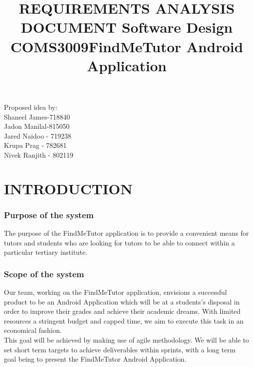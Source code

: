 \documentclass[12pt]{article}
\begin{document}
\title{\textbf{REQUIREMENTS ANALYSIS DOCUMENT }}
\maketitle

\begin{center}
\title{\textbf{Software Design COMS3009}}
\maketitle 
\end{center}
\begin{center}
\title{\textbf{FindMeTutor Android Application}}
\maketitle 
\end{center}

\begin{center}
Proposed idea by:\\
Shaneel James-718840
\\Jadon Manilal-815050
\\Jared Naidoo - 719238
\\Krupa Prag - 782681
\\Nivek Ranjith - 802119
\end{center}

\newpage

\tableofcontents
\newpage
\section{INTRODUCTION}
\subsubsection{Purpose of the system}
\begin{flushleft}
The purpose of the FindMeTutor application is to provide a convenient means for tutors and students who are looking for tutors to be able to connect within a particular tertiary institute.
\end{flushleft}
\subsubsection{Scope of the system}
\begin{flushleft}
Our team, working on the FindMeTutor application, envisions a successful product to be an Android Application which will be at a students's disposal in order to improve their grades and achieve their academic dreams. With limited resources a  stringent budget and capped time, we aim to execute this task in an economical fashion.\\
This goal will be achieved by making use of agile methodology. We will be able to set short term targets to achieve deliverables within sprints, with a long term goal being to present the FindMeTutor Android Application. 
\end{flushleft}
\end{document}
